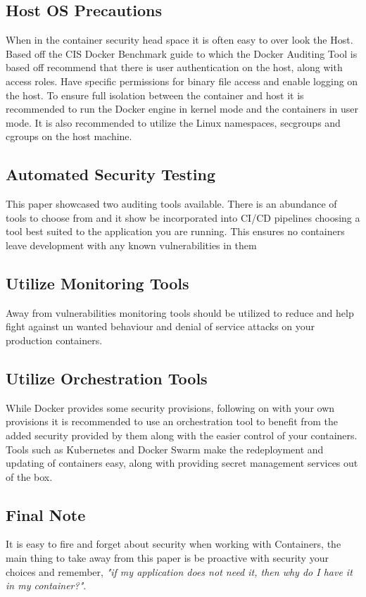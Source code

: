 \subsection{Host OS Precautions}
When in the container security head space it is often easy to over look the Host. Based off the CIS Docker Benchmark guide to which the Docker Auditing Tool is based off recommend that there is user authentication on the host, along with access roles. Have specific permissions for binary file access and enable logging on the host.
To ensure full isolation between the container and host it is recommended to run the Docker engine in kernel mode and the containers in user mode. It is also recommended to utilize the Linux namespaces, secgroups and cgroups on the host machine.
\subsection{Automated Security Testing}
This paper showcased two auditing tools available. There is an abundance of tools to choose from and it show be incorporated into CI/CD pipelines choosing a tool best suited to the application you are running. This ensures no containers leave development with any known vulnerabilities in them
\subsection{Utilize Monitoring Tools}
Away from vulnerabilities monitoring tools should be utilized to reduce and help fight against un wanted behaviour and denial of service attacks on your production containers.
\subsection{Utilize Orchestration Tools}
While Docker provides some security provisions, following on with your own provisions it is recommended to use an orchestration tool to benefit from the added security provided by them along with the easier control of your containers. Tools such as Kubernetes and Docker Swarm make the redeployment and updating of containers easy, along with providing secret management services out of the box.

\subsection*{Final Note}
It is easy to fire and forget about security when working with Containers, the main thing to take away from this paper is be proactive with security your choices and remember, \textit{"if my application does not need it, then why do I have it in my container?"}.